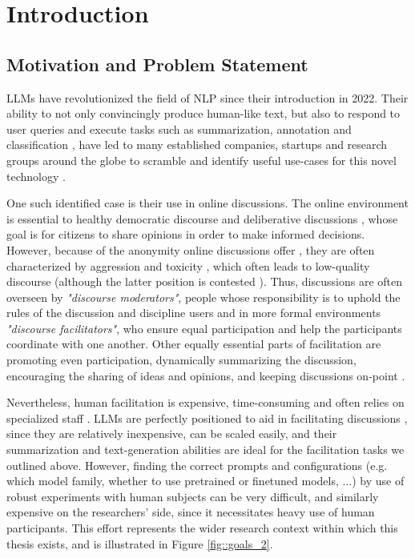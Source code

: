 %
\chapter{Introduction}
\label{sec:intro}

\section{Motivation and Problem Statement}
\label{sec:intro:motivation}

\acp{LLM} have revolutionized the field of \ac{NLP} since their introduction in 2022. Their ability to not only convincingly produce human-like text, but also to respond to user queries and execute tasks such as summarization, annotation and classification \cite{ts2024, tan2024largelanguagemodelsdata}, have led to many established companies, startups and research groups around the globe to scramble and identify useful use-cases for this novel technology \cite{HadiASO, Zhou2024LargeLM, Hutchinson2024LLMAssistedVA}.

One such identified case is their use in online discussions. The online environment is essential to  healthy democratic discourse \cite{WrightDemocracy, Janssen2005, Papacharissi2004DemocracyOC} and deliberative discussions \cite{small2021polis}, whose goal is for citizens to share opinions in order to make informed decisions. However, because of the anonymity online discussions offer \cite{Avalle2024PersistentIP}, they are often characterized by aggression and toxicity \cite{XiaToxicity}, which often leads to low-quality discourse \cite{WrightDemocracy} (although the latter position is contested \cite{Papacharissi2004DemocracyOC}). Thus, discussions are often overseen by \textit{"discourse moderators"}, people whose responsibility is to uphold the rules of the discussion and discipline users and in more formal environments \textit{"discourse facilitators"}, who ensure equal participation and help the participants coordinate with one another. Other equally essential parts of facilitation are promoting even participation, dynamically summarizing the discussion, encouraging the sharing of ideas and opinions, and keeping discussions on-point \cite{Harvard2024, Wang2008StudentfacilitatorsRI}.

Nevertheless, human facilitation is expensive, time-consuming and often relies on specialized staff \cite{small-polis-llm}. LLMs are perfectly positioned to aid in facilitating discussions \cite{small-polis-llm}, since they are relatively inexpensive, can be scaled easily, and their summarization and text-generation abilities are ideal for the facilitation tasks we outlined above. However, finding the correct prompts and configurations (e.g. which model family, whether to use pretrained or finetuned models, ...) by use of robust experiments with human subjects can be very difficult, and similarly expensive on the researchers' side, since it necessitates heavy use of human participants. This effort represents the wider research context within which this thesis exists, and is illustrated in Figure \ref{fig::goals_2}.

